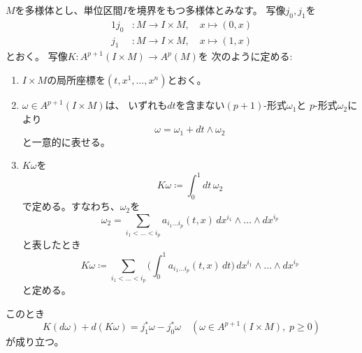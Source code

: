 \documentclass[report]{jlreq}
\begin{document}
\begin{lemma}[ホモトピー作用素$K$]
    $M$を多様体とし、単位区間$I$を境界をもつ多様体とみなす。
    写像$j_0, j_1$を
    \begin{alignat}{1}
        j_0 &\colon M \to I \times M, \quad x \mapsto (0, x) \\
        j_1 &\colon M \to I \times M, \quad x \mapsto (1, x)
    \end{alignat}
    とおく。
    写像$K \colon A^{p + 1}(I \times M) \to A^p(M)$を
    次のように定める:
    \begin{enumerate}
        \item $I \times M$の局所座標を$(t, x^1, \dots, x^n)$とおく\footnotemark{}。
        \item $\omega \in A^{p + 1}(I \times M)$は、
            いずれも$dt$を含まない$(p + 1)$-形式$\omega_1$と
            $p$-形式$\omega_2$により
            \begin{equation}
                \omega = \omega_1 + dt \wedge \omega_2
            \end{equation}
            と一意的に表せる。
        \item $K\omega$を
            \begin{equation}
                K\omega \coloneqq \int_0^1 dt \, \omega_2
            \end{equation}
            で定める。すなわち、$\omega_2$を
            \begin{equation}
                \omega_2 = \sum_{i_1 < \dots < i_p}
                    a_{i_1 \dots i_p} (t, x) \, dx^{i_1} \wedge \dots \wedge dx^{i_p}
            \end{equation}
            と表したとき
            \begin{equation}
                K\omega \coloneqq \sum_{i_1 < \dots < i_p}
                    \biggr( \int_0^1 a_{i_1 \dots i_p} (t, x) \, dt \biggl)
                    \, dx^{i_1} \wedge \dots \wedge dx^{i_p}
            \end{equation}
            と定める\footnotemark{}。
    \end{enumerate}
    このとき
    \begin{equation}
        K(d\omega) + d(K\omega) = j_1^* \omega - j_0^* \omega
        \quad
        (\omega \in A^{p + 1}(I \times M), \; p \ge 0)
    \end{equation}
    が成り立つ\footnotemark{}。
\end{lemma}

\end{document}

